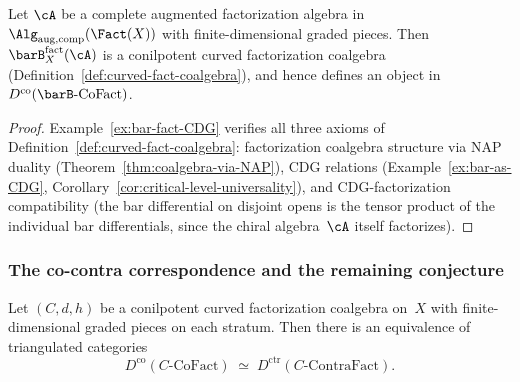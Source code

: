 \begin{proposition}
\label{prop:bar-ran-well-defined}
Let $\cA$ be a complete augmented factorization algebra in
$\Alg_{\mathrm{aug,comp}}(\Fact(X))$ with finite-dimensional
graded pieces. Then $\barB_X^{\mathrm{fact}}(\cA)$ is a
conilpotent curved factorization coalgebra
\textup{(}Definition~\textup{\ref{def:curved-fact-coalgebra}}),
and hence defines an object in
$D^{\mathrm{co}}(\barB\text{-}\mathrm{CoFact})$.
\end{proposition}

\begin{proof}
Example~\ref{ex:bar-fact-CDG} verifies all three axioms of
Definition~\ref{def:curved-fact-coalgebra}: factorization
coalgebra structure via NAP duality
(Theorem~\ref{thm:coalgebra-via-NAP}), CDG relations
(Example~\ref{ex:bar-as-CDG},
Corollary~\ref{cor:critical-level-universality}), and
CDG-factorization compatibility (the bar differential on disjoint
opens is the tensor product of the individual bar differentials,
since the chiral algebra~$\cA$ itself factorizes).
\end{proof}

\subsubsection*{The co-contra correspondence and the remaining conjecture}

\begin{theorem}
\label{thm:fact-co-contra-general}
Let $(C, d, h)$ be a conilpotent curved factorization coalgebra
on~$X$ with finite-dimensional graded pieces on each stratum.
Then there is an equivalence of triangulated categories
\begin{equation}\label{eq:fact-co-contra}
D^{\mathrm{co}}(C\text{-}\mathrm{CoFact})
\;\simeq\;
D^{\mathrm{ctr}}(C\text{-}\mathrm{ContraFact}).
\end{equation}
\end{theorem}

